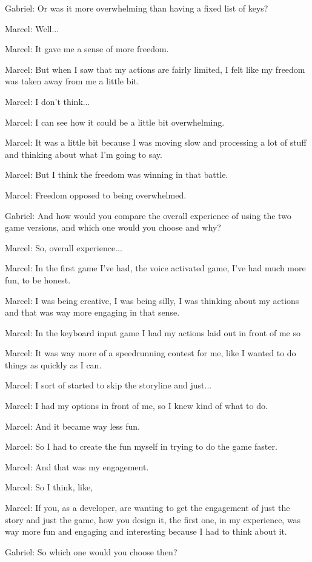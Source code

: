 Gabriel: Or was it more overwhelming than having a fixed list of keys?

Marcel: Well...

Marcel: It gave me a sense of more freedom.

Marcel: But when I saw that my actions are fairly limited, I felt like my freedom was taken away from me a little bit.

Marcel: I don't think...

Marcel: I can see how it could be a little bit overwhelming.

Marcel: It was a little bit because I was moving slow and processing a lot of stuff and thinking about what I'm going to say.

Marcel: But I think the freedom was winning in that battle.

Marcel: Freedom opposed to being overwhelmed.

Gabriel: And how would you compare the overall experience of using the two game versions, and which one would you choose and why?

Marcel: So, overall experience...

Marcel: In the first game I've had, the voice activated game, I've had much more fun, to be honest.

Marcel: I was being creative, I was being silly, I was thinking about my actions and that was way more engaging in that sense.

Marcel: In the keyboard input game I had my actions laid out in front of me so

Marcel: It was way more of a speedrunning contest for me, like I wanted to do things as quickly as I can.

Marcel: I sort of started to skip the storyline and just...

Marcel: I had my options in front of me, so I knew kind of what to do.

Marcel: And it became way less fun.

Marcel: So I had to create the fun myself in trying to do the game faster.

Marcel: And that was my engagement.

Marcel: So I think, like,

Marcel: If you, as a developer, are wanting to get the engagement of just the story and just the game, how you design it, the first one, in my experience, was way more fun and engaging and interesting because I had to think about it.

Gabriel: So which one would you choose then?

